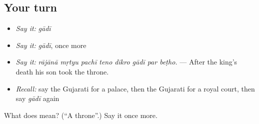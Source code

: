 \subsection*{Your turn}
\begin{itemize}
\raggedright
  \item \emph{Say it:} \emph{gādī}
  \item \emph{Say it:} \emph{gādī}, once more
  \item \emph{Say it:} \emph{rājānā mṛtyu pachī teno dīkro gādī par beṭho.} — After the king's death his son took the throne.
  \item \emph{Recall:} say the Gujarati for a palace, then the Gujarati for a royal court, then say \emph{gādī} again
\end{itemize}

\begin{tcolorbox}[breakable,colback=teal!4,colframe=teal!35!black,title={Before you move on}]
What does  mean? (\textquotedblleft{}A throne\textquotedblright{}.) Say it once more.
\end{tcolorbox}
